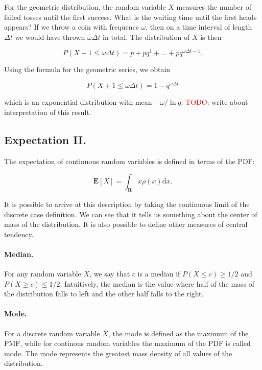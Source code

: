 \documentclass[12pt]{article}
\begin{document}
For the geometric distribution, the random variable $X$ measures the number of failed tosses
until the first success.
What is the waiting time until the first heads appears?
If we throw a coin with frequence $\omega$, then on a time interval of length $\Delta t$
we would have thrown $\omega \Delta t$ in total.
The distribution of $X$ is then

\begin{equation}
P(X + 1 \leq \omega \Delta t) = p  + p q^{1} + \ldots + p q^{\omega \Delta t - 1}.
\end{equation}

\noindent
Using the formula for the geometric series, we obtain

\begin{equation}
P(X + 1 \leq \omega \Delta t) = 1 - q^{\omega \Delta t}
\end{equation}

\noindent
which is an exponential distribution with mean $- \omega / \ln q$.
\textcolor{red}{TODO:} write about interpretation of this result.

\subsection{Expectation II.}
The expectation of continuous random variables is defined in 
terms of the PDF: 

\begin{equation}
\mathbf{E} [ X ] = \int_{\mathbf{R}} x \rho(x) \mathrm{d} x.
\end{equation}

\noindent
It is possible to arrive at this description by taking the continuous limit
of the discrete case definition.
We can see that it tells us something about the center of mass of the distribution.
It is also possible to define other measures of central tendency.

\paragraph{Median.}
For any random variable $X$, we say that $c$ is a median if $P(X \leq c) \geq 1/2$ and
$P(X \geq c ) \leq 1/2$.
Intuitively, the median is the value where half of the mass of the distribution falls
to left and the other half falls to the right.

\paragraph{Mode.}
For a discrete random variable $X$, the mode is defined as the maximum of the PMF, 
while for continous random variables the maximum of the PDF is called mode.
The mode represents the greatest mass density of all values of the distribution.
\end{document}
